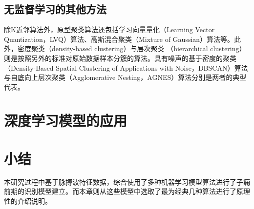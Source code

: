 \subsection{无监督学习的其他方法}
除K近邻算法外，原型聚类算法还包括学习向量量化（Learning Vector Quantization，LVQ）算法、高斯混合聚类（Mixture of Gaussian）算法等。此外，密度聚类（density-based clustering）与层次聚类
（hierarchical clustering）则是按照另外的标准对原始数据样本分簇的算法。具有噪声的基于密度的聚类（Density-Based Spatial Clustering of Applications with Noise，DBSCAN）算法
与自底向上层次聚类（Agglomerative Nesting，AGNES）算法分别是两者的典型代表\cite{Zhou2016}。

\section{深度学习模型的应用}
\section{小结}
本研究过程中基于脉搏波特征数据，综合使用了多种机器学习模型算法进行了子痫前期的识别模型建立。而本章则从这些模型中选取了最为经典几种算法进行了原理性的介绍说明。
